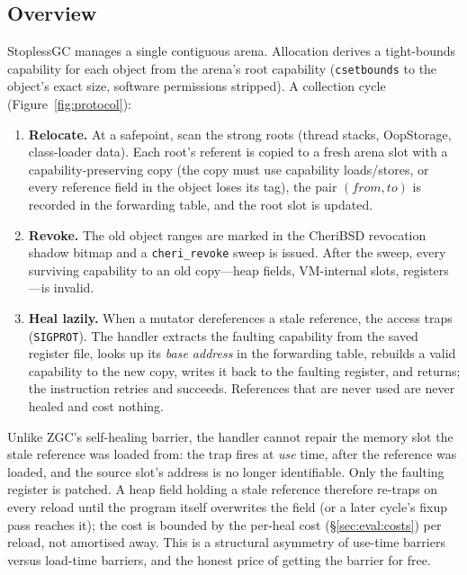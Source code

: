 \documentclass[acmsmall,nonacm,screen]{acmart}
\begin{document}
\subsection{Overview}

StoplessGC manages a single contiguous arena. Allocation derives a
tight-bounds capability for each object from the arena's root
capability (\texttt{csetbounds} to the object's exact size, software
permissions stripped). A collection cycle (Figure~\ref{fig:protocol}):

\begin{enumerate}
\item \textbf{Relocate.} At a safepoint, scan the strong roots (thread
  stacks, OopStorage, class-loader data). Each root's referent is
  copied to a fresh arena slot with a capability-preserving copy (the
  copy must use capability loads/stores, or every reference field in
  the object loses its tag), the pair $(\mathit{from},\mathit{to})$ is
  recorded in the forwarding table, and the root slot is updated.
\item \textbf{Revoke.} The old object ranges are marked in the
  CheriBSD revocation shadow bitmap and a \texttt{cheri\_revoke} sweep
  is issued. After the sweep, every surviving capability to an old
  copy---heap fields, VM-internal slots, registers---is invalid.
\item \textbf{Heal lazily.} When a mutator dereferences a stale
  reference, the access traps (\texttt{SIGPROT}). The handler extracts
  the faulting capability from the saved register file, looks up its
  \emph{base address} in the forwarding table, rebuilds a valid
  capability to the new copy, writes it back to the faulting register,
  and returns; the instruction retries and succeeds. References that
  are never used are never healed and cost nothing.
\end{enumerate}

Unlike ZGC's self-healing barrier, the handler cannot repair the
memory slot the stale reference was loaded from: the trap fires at
\emph{use} time, after the reference was loaded, and the source slot's
address is no longer identifiable. Only the faulting register is
patched. A heap field holding a stale reference therefore re-traps on
every reload until the program itself overwrites the field (or a later
cycle's fixup pass reaches it); the cost is bounded by the per-heal
cost (\S\ref{sec:eval:costs}) per reload, not amortised away. This is
a structural asymmetry of use-time barriers versus load-time barriers,
and the honest price of getting the barrier for free.
\end{document}
